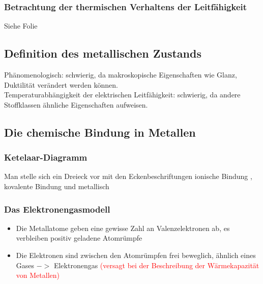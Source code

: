 \documentclass[a4paper, 12pt]{article}
\begin{document}
\subsubsection{Betrachtung der thermischen Verhaltens der Leitfähigkeit}
Siehe Folie
\subsection{Definition des metallischen Zustands}
Phänomenologisch: schwierig, da makroskopische Eigenschaften wie Glanz, Duktilität verändert werden können.\\
Temperaturabhängigkeit der elektrischen Leitfähigkeit: schwierig, da andere Stoffklassen ähnliche Eigenschaften aufweisen.
\subsection{Die chemische Bindung in Metallen}
\subsubsection{Ketelaar-Diagramm}
Man stelle sich ein Dreieck vor mit den Eckenbeschriftungen ionische Bindung , kovalente Bindung  und metallisch 
\subsubsection{Das Elektronengasmodell}
\begin{itemize}
    \item Die Metallatome geben eine gewisse Zahl an Valenzelektronen ab, es verbleiben positiv geladene Atomrümpfe
    \item Die Elektronen sind zwischen den Atomrümpfen frei beweglich, ähnlich eines Gases $->$ Elektronengas \textcolor{red}{(versagt bei der Beschreibung der Wärmekapazität von Metallen)}
\end{itemize}
\end{document}
